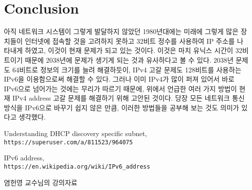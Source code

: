 \documentclass{report}
\begin{document}
\section{Conclusion}
아직 네트워크 시스템이 그렇게 발달하지 않았던 1980년대에는 미래에 그렇게 많은 장치들이 인터넷에 접속할 것을 고려하지 못하고 32비트 정수를 사용하여 IP 주소를 나타내게 하였고, 이것이 현재 문제가 되고 있는 것이다. 이것은 마치 유닉스 시간이 32비트이기 때문에 2038년에 문제가 생기게 되는 것과 유사하다고 볼 수 있다. 2038년 문제도 64비트로 정보의 크기를 늘려 해결하듯이, IPv4 고갈 문제도 128비트를 사용하는 IPv6을 이용함으로써 해결할 수 있다. 그러나 이미 IPv4가 많이 퍼져 있어서 바로 IPv6으로 넘어가는 것에는 무리가 따르기 때문에, 위에서 언급한 여러 가지 방법이 현재 IPv4 address 고갈 문제를 해결하기 위해 고안된 것이다. 당장 모든 네트워크 통신 방식을 IPv6으로 바꾸기 쉽지 않은 만큼, 이러한 방법들을 공부해 보는 것도 의미가 있다고 생각했다.


\begin{thebibliography}{9}
  Understanding DHCP discovery specific subnet,
  \\\texttt{https://superuser.com/a/811523/964075}
  
  IPv6 address,
  \\\texttt{https://en.wikipedia.org/wiki/IPv6\_address}
  
  염헌영 교수님의 강의자료
  \\\texttt{}
  

\end{thebibliography}
\end{document}
